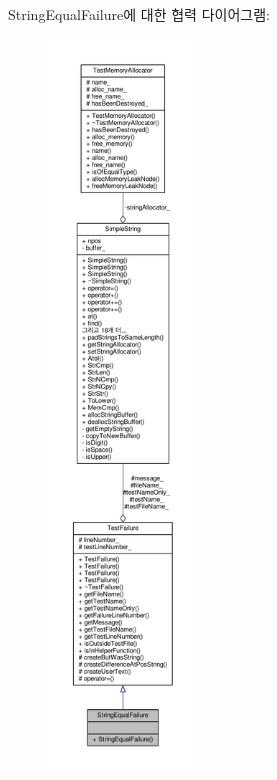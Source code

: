 String\+Equal\+Failure에 대한 협력 다이어그램\+:
\nopagebreak
\begin{figure}[H]
\begin{center}
\leavevmode
\includegraphics[height=550pt]{class_string_equal_failure__coll__graph}
\end{center}
\end{figure}
